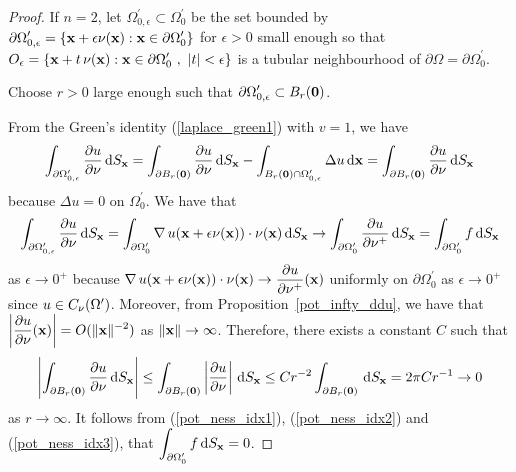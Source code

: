 \begin{proof}
If $n=2$, let
$\displaystyle \Omega^{\prime}_{0,\epsilon} \subset \Omega^{\prime}_0$ be
the set bounded by
$\displaystyle \partial \Omega^{\prime}_{0,\epsilon}
= \{ \mathbf{x} + \epsilon \mathbf{\nu}(\mathbf{x}) :
\mathbf{x} \in \partial \Omega^{\prime}_0 \}$ for $\epsilon>0$ small
enough so that
$\displaystyle
O_{\epsilon} = \left\{ \mathbf{x} + t\, \mathbf{\nu}(\mathbf{x}) : \mathbf{x} \in
  \partial \Omega_0^{\prime} \ , \ |t|<\epsilon \right\}$ is a tubular
neighbourhood of $\displaystyle \partial \Omega = \partial \Omega^{\prime}_0$.

Choose $r>0$ large enough such that
$\displaystyle \partial \Omega^{\prime}_{0,\epsilon} \subset B_r(\mathbf{0})$.

From the Green's identity (\ref{laplace_green1}) with $v=1$, we have
\begin{equation} \label{pot_ness_idx1}
\int_{\partial \Omega^{\prime}_{0,\epsilon}} \frac{\partial{u}}{\partial \mathbf{\nu}} \,\mathrm{d}{S}_{\mathbf{x}}
= \int_{\partial B_r(\mathbf{0})} \frac{\partial{u}}{\partial \mathbf{\nu}} \,\mathrm{d}{S}_{\mathbf{x}}
- \int_{B_r(\mathbf{0}) \cap \Omega^{\prime}_{0,\epsilon}} \Delta u \,\mathrm{d}{\mathbf{x}} =
\int_{\partial B_r(\mathbf{0})} \frac{\partial{u}}{\partial \mathbf{\nu}} \,\mathrm{d}{S}_{\mathbf{x}}
\end{equation}
because $\displaystyle \Delta u = 0$ on $\Omega_0^{\prime}$.  We have that
\begin{equation} \label{pot_ness_idx2}
\int_{\partial \Omega^{\prime}_{0,\epsilon}} \frac{\partial{u}}{\partial \mathbf{\nu}} \,\mathrm{d}{S}_{\mathbf{x}}
= \int_{\partial \Omega^{\prime}_0} \operatorname{\nabla} u(\mathbf{x}
+ \epsilon \mathbf{\nu}(\mathbf{x}))
\cdot \mathbf{\nu}(\mathbf{x}) \,\mathrm{d}{S}_{\mathbf{x}}
\rightarrow \int_{\partial \Omega^{\prime}_0}
\frac{\partial{u}}{\partial \mathbf{\nu}^+} \,\mathrm{d}{S}_{\mathbf{x}}
= \int_{\partial \Omega^{\prime}_0} f \,\mathrm{d}{S}_{\mathbf{x}}
\end{equation}
as $\epsilon \rightarrow 0^+$ because
$\displaystyle
\operatorname{\nabla} u(\mathbf{x} + \epsilon \mathbf{\nu}(\mathbf{x})) \cdot \mathbf{\nu}(\mathbf{x})
\to \frac{\partial{u}}{\partial \mathbf{\nu}^+}(\mathbf{x})$ uniformly on
$\partial \Omega^{\prime}_0$ as
$\epsilon \to 0^+$ since $u \in C_{\mathbf{\nu}}(\Omega^{\prime})$.
Moreover, from Proposition~\ref{pot_infty_ddu}, we have that 
$\displaystyle \left| \frac{\partial{u}}{\partial \mathbf{\nu}}(\mathbf{x})\right| =
O(\|\mathbf{x}\|^{-2})$ as $\|\mathbf{x}\|\rightarrow \infty$.  Therefore,
there exists a constant $C$ such that
\begin{equation} \label{pot_ness_idx3}
\left| \int_{\partial B_r(\mathbf{0})} \frac{\partial{u}}{\partial \mathbf{\nu}} 
\,\mathrm{d}{S}_{\mathbf{x}} \right| \leq
\int_{\partial B_r(\mathbf{0})} \left| \frac{\partial{u}}{\partial \mathbf{\nu}} \right|
\,\mathrm{d}{S}_{\mathbf{x}} \leq C r^{-2} \int_{\partial B_r(\mathbf{0})}
\,\mathrm{d}{S}_{\mathbf{x}}
= 2\pi C r^{-1} \rightarrow 0
\end{equation}
as $r \rightarrow \infty$.
It follows from (\ref{pot_ness_idx1}), (\ref{pot_ness_idx2}) and
(\ref{pot_ness_idx3}), that
$\displaystyle \int_{\partial \Omega^{\prime}_0} f \,\mathrm{d}{S}_{\mathbf{x}} = 0$.
\end{proof}

